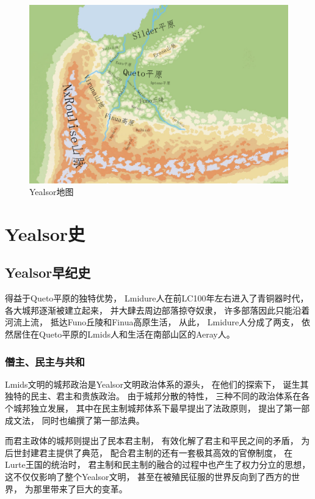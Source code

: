 \documentclass[UTF8,12pt]{ctexbook}
\begin{document}
        \newpage
        \begin{figure}[!h]
            \centering
            \includegraphics[scale=0.2]{Yealsor.png}
            \caption{Yealsor地图}
        \end{figure}
        

        

\part{Yealsor史}
    \chapter{Yealsor早纪史}
    得益于Queto平原的独特优势，
    Lmidure人在前LC100年左右进入了青铜器时代，
    各大城邦逐渐被建立起来，
    并大肆去周边部落掠夺奴隶，
    许多部落因此只能沿着河流上流，
    抵达Funo丘陵和Finua高原生活，
    从此，
    Lmidure人分成了两支，
    依然居住在Queto平原的Lmids人和生活在南部山区的Aeray人。
        \section{僭主、民主与共和}
            Lmids文明的城邦政治是Yealsor文明政治体系的源头，
            在他们的探索下，
            诞生其独特的民主、君主和贵族政治。
            由于城邦分散的特性，
            三种不同的政治体系在各个城邦独立发展，
            其中在民主制城邦体系下最早提出了法政原则，
            提出了第一部成文法，
            同时也编撰了第一部法典。

            而君主政体的城邦则提出了民本君主制，
            有效化解了君主和平民之间的矛盾，
            为后世封建君主提供了典范，
            配合君主制的还有一套极其高效的官僚制度，
            在Lurte王国的统治时，
            君主制和民主制的融合的过程中也产生了权力分立的思想，
            这不仅仅影响了整个Yealsor文明，
            甚至在被殖民征服的世界反向到了西方的世界，
            为那里带来了巨大的变革。
\end{document}
